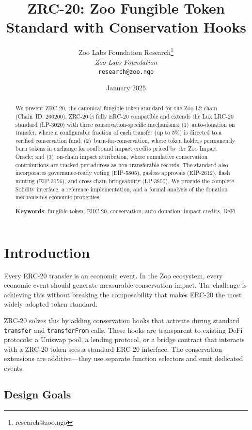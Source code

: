 \documentclass[11pt,letterpaper]{article}
\title{\textbf{ZRC-20: Zoo Fungible Token Standard with Conservation Hooks}}
\author{
Zoo Labs Foundation Research\thanks{research@zoo.ngo}\\
\textit{Zoo Labs Foundation}\\
\texttt{research@zoo.ngo}
}
\date{January 2025}
\begin{document}
\zoocoverpage

\begin{abstract}
We present ZRC-20, the canonical fungible token standard for the Zoo L2 chain (Chain~ID: 200200). ZRC-20 is fully ERC-20 compatible and extends the Lux LRC-20 standard (LP-3020) with three conservation-specific mechanisms: (1)~auto-donation on transfer, where a configurable fraction of each transfer (up to 5\%) is directed to a verified conservation fund; (2)~burn-for-conservation, where token holders permanently burn tokens in exchange for soulbound impact credits priced by the Zoo Impact Oracle; and (3)~on-chain impact attribution, where cumulative conservation contributions are tracked per address as non-transferable records. The standard also incorporates governance-ready voting (EIP-5805), gasless approvals (EIP-2612), flash minting (EIP-3156), and cross-chain bridgeability (LP-3800). We provide the complete Solidity interface, a reference implementation, and a formal analysis of the donation mechanism's economic properties.

\textbf{Keywords}: fungible token, ERC-20, conservation, auto-donation, impact credits, DeFi
\end{abstract}

\section{Introduction}

Every ERC-20 transfer is an economic event. In the Zoo ecosystem, every economic event should generate measurable conservation impact. The challenge is achieving this without breaking the composability that makes ERC-20 the most widely adopted token standard.

ZRC-20 solves this by adding conservation hooks that activate during standard \texttt{transfer} and \texttt{transferFrom} calls. These hooks are transparent to existing DeFi protocols: a Uniswap pool, a lending protocol, or a bridge contract that interacts with a ZRC-20 token sees a standard ERC-20 interface. The conservation extensions are additive---they use separate function selectors and emit dedicated events.

\subsection{Design Goals}
\end{document}
